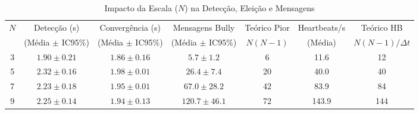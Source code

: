 \begin{table}[htbp]
\caption{Impacto da Escala ($N$) na Detecção, Eleição e Mensagens}
\label{tab:grade_nos}
\centering
\small
\begin{tabular}{@{}ccccccc@{}}
\toprule
$N$ & Detecção (s) & Convergência (s) & Mensagens Bully & Teórico Pior & Heartbeats/s & Teórico HB \\
 & (Média $\pm$ IC95\%) & (Média $\pm$ IC95\%) & (Média $\pm$ IC95\%) & $N(N-1)$ & (Média) & $N(N-1)/\Delta t$ \\
\midrule
3 & $1.90 \pm 0.21$ & $1.86 \pm 0.16$ & $5.7 \pm 1.2$ & 6 & 11.6 & 12 \\
5 & $2.32 \pm 0.16$ & $1.98 \pm 0.01$ & $26.4 \pm 7.4$ & 20 & 40.0 & 40 \\
7 & $2.23 \pm 0.18$ & $1.95 \pm 0.01$ & $67.0 \pm 28.2$ & 42 & 83.9 & 84 \\
9 & $2.25 \pm 0.14$ & $1.94 \pm 0.13$ & $120.7 \pm 46.1$ & 72 & 143.9 & 144 \\
\bottomrule
\end{tabular}
\end{table}
